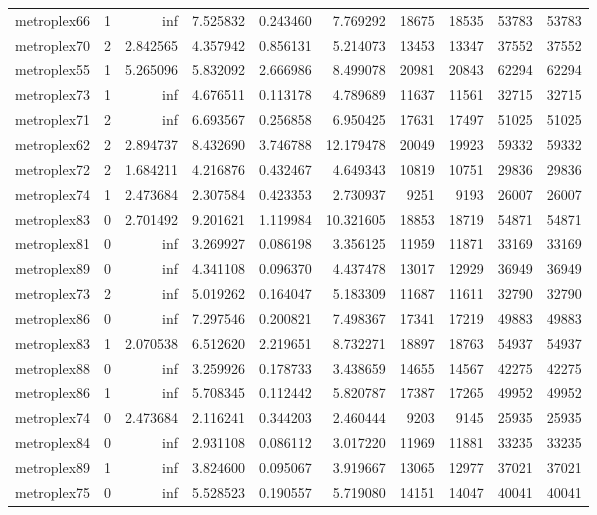 \begin{longtable}{|l|r|r|r|r|r|r|r|r|r|}
metroplex66 & 1 & inf & 7.525832 & 0.243460 & 7.769292 & 18675 & 18535 & 53783 & 53783 \\
metroplex70 & 2 & 2.842565 & 4.357942 & 0.856131 & 5.214073 & 13453 & 13347 & 37552 & 37552 \\
metroplex55 & 1 & 5.265096 & 5.832092 & 2.666986 & 8.499078 & 20981 & 20843 & 62294 & 62294 \\
metroplex73 & 1 & inf & 4.676511 & 0.113178 & 4.789689 & 11637 & 11561 & 32715 & 32715 \\
metroplex71 & 2 & inf & 6.693567 & 0.256858 & 6.950425 & 17631 & 17497 & 51025 & 51025 \\
metroplex62 & 2 & 2.894737 & 8.432690 & 3.746788 & 12.179478 & 20049 & 19923 & 59332 & 59332 \\
metroplex72 & 2 & 1.684211 & 4.216876 & 0.432467 & 4.649343 & 10819 & 10751 & 29836 & 29836 \\
metroplex74 & 1 & 2.473684 & 2.307584 & 0.423353 & 2.730937 & 9251 & 9193 & 26007 & 26007 \\
metroplex83 & 0 & 2.701492 & 9.201621 & 1.119984 & 10.321605 & 18853 & 18719 & 54871 & 54871 \\
metroplex81 & 0 & inf & 3.269927 & 0.086198 & 3.356125 & 11959 & 11871 & 33169 & 33169 \\
metroplex89 & 0 & inf & 4.341108 & 0.096370 & 4.437478 & 13017 & 12929 & 36949 & 36949 \\
metroplex73 & 2 & inf & 5.019262 & 0.164047 & 5.183309 & 11687 & 11611 & 32790 & 32790 \\
metroplex86 & 0 & inf & 7.297546 & 0.200821 & 7.498367 & 17341 & 17219 & 49883 & 49883 \\
metroplex83 & 1 & 2.070538 & 6.512620 & 2.219651 & 8.732271 & 18897 & 18763 & 54937 & 54937 \\
metroplex88 & 0 & inf & 3.259926 & 0.178733 & 3.438659 & 14655 & 14567 & 42275 & 42275 \\
metroplex86 & 1 & inf & 5.708345 & 0.112442 & 5.820787 & 17387 & 17265 & 49952 & 49952 \\
metroplex74 & 0 & 2.473684 & 2.116241 & 0.344203 & 2.460444 & 9203 & 9145 & 25935 & 25935 \\
metroplex84 & 0 & inf & 2.931108 & 0.086112 & 3.017220 & 11969 & 11881 & 33235 & 33235 \\
metroplex89 & 1 & inf & 3.824600 & 0.095067 & 3.919667 & 13065 & 12977 & 37021 & 37021 \\
metroplex75 & 0 & inf & 5.528523 & 0.190557 & 5.719080 & 14151 & 14047 & 40041 & 40041 \\

\end{longtable}
